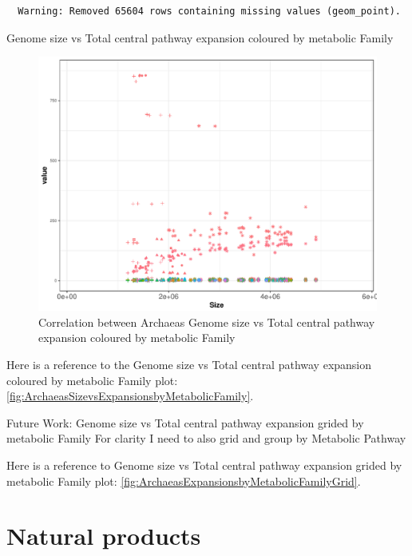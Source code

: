 \documentclass[12pt,twoside]{reedthesis}
\begin{document}
  \begin{verbatim}
  Warning: Removed 65604 rows containing missing values (geom_point).
  \end{verbatim}
  
  Genome size vs Total central pathway expansion coloured by metabolic
  Family
  
  \begin{figure}[h!tbp]
  \centering
  \includegraphics[angle = 0,scale = 0.6]{chapter3/ArchaeasSizevsExpansionsbyMetabolicFamily.pdf}
  \caption[Correlation between Archaeas Genome size vs Total central pathway expansion coloured by metabolic Family]{\normalsize{Correlation between Archaeas Genome size vs Total central pathway expansion coloured by metabolic Family}}
  \label{fig:ArchaeasSizevsExpansionsbyMetabolicFamily}
  \end{figure}
  
  Here is a reference to the Genome size vs Total central pathway
  expansion coloured by metabolic Family plot:
  \autoref{fig:ArchaeasSizevsExpansionsbyMetabolicFamily}. \clearpage 
  
  Future Work: Genome size vs Total central pathway expansion grided by
  metabolic Family For clarity I need to also grid and group by Metabolic
  Pathway
  
  Here is a reference to Genome size vs Total central pathway expansion
  grided by metabolic Family plot:
  \autoref{fig:ArchaeasExpansionsbyMetabolicFamilyGrid}. \clearpage 
  
  \section{Natural products}\label{natural-products}
  
\end{document}
